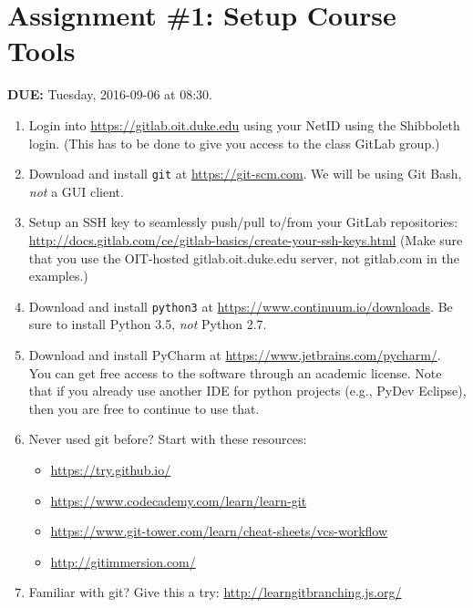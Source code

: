 


\section*{Assignment \#1: Setup Course Tools}

{\bf DUE:} Tuesday, 2016-09-06 at 08:30.

\begin{enumerate}

\item Login into \url{https://gitlab.oit.duke.edu} using your NetID using the Shibboleth login.  (This has to be done to give you access to the class GitLab group.)

\item Download and install \verb+git+ at \url{https://git-scm.com}.  We will be using Git Bash, \emph{not} a GUI client.

\item Setup an SSH key to seamlessly push/pull to/from your GitLab repositories: \url{http://docs.gitlab.com/ce/gitlab-basics/create-your-ssh-keys.html}  (Make sure that you use the OIT-hosted gitlab.oit.duke.edu server, not gitlab.com in the examples.)

\item Download and install \verb+python3+ at \url{https://www.continuum.io/downloads}.  Be sure to install Python 3.5, \emph{not} Python 2.7.

\item Download and install PyCharm at \url{https://www.jetbrains.com/pycharm/}.  You can get free access to the software through an academic license.  Note that if you already use another IDE for python projects (e.g., PyDev Eclipse), then you are free to continue to use that.

\item Never used git before?  Start with these resources:
\begin{itemize}
    \item \url{https://try.github.io/}
    \item \url{https://www.codecademy.com/learn/learn-git}
    \item \url{https://www.git-tower.com/learn/cheat-sheets/vcs-workflow}
    \item \url{http://gitimmersion.com/}
\end{itemize}

\item Familiar with git?  Give this a try: \url{http://learngitbranching.js.org/}


\end{enumerate}
